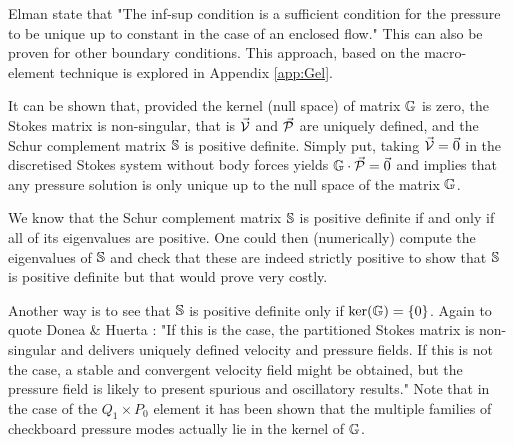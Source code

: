 Elman \etal \cite{elsw} state that "The inf-sup condition is a sufficient condition 
for the pressure to be unique up
to  constant in the case of an enclosed flow." This can also be proven for other boundary conditions.
This approach, based on the macro-element technique \cite{sten90} is explored in Appendix \ref{app:Gel}.


It can be shown that, provided the kernel (null space) of matrix ${\mathbb{G}}$ is zero,
the Stokes matrix is non-singular, that is $\vec{\cal V}$ and $\vec{\cal P}$ 
are uniquely defined, and the Schur complement matrix ${\mathbb{S}}$ is positive definite. 
Simply put, taking $\vec{\cal V}=\vec{0}$ in the discretised Stokes system 
without body forces yields ${\mathbb{G}} \cdot \vec{\cal P}=\vec{0}$ and implies
that any pressure solution is only unique up to the null space of the matrix ${\mathbb{G}}$.

We know that the Schur complement matrix ${\mathbb{S}}$ is positive definite if and only if all of its eigenvalues are positive.
One could then (numerically) compute the eigenvalues of ${\mathbb{S}}$ and check that these are indeed strictly positive
to show that ${\mathbb{S}}$ is positive definite but that would prove very costly. 

Another way is to see that ${\mathbb{S}}$ is positive definite only if $\text{ker}({\mathbb{G}})=\{0\}$.
Again to quote Donea \& Huerta \cite{dohu03}: "If this is the case, the partitioned Stokes matrix  
is non-singular and delivers uniquely defined velocity and pressure fields. If this is not the case, a
stable and convergent velocity field might be obtained, but the pressure field is likely
to present spurious and oscillatory results." 
Note that in the case of the $Q_1 \times P_0$ element it has been shown that the multiple families of 
checkboard pressure modes actually lie in the kernel of ${\mathbb{G}}$. \cite{sagl81a,sagl81b}

\hspace{.4cm}

